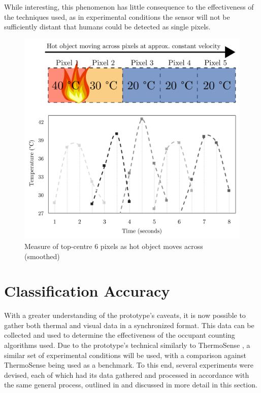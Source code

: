 \documentclass[../thesis/thesis.tex]{subfiles}
\begin{document}
While interesting, this phenomenon has little consequence to the effectiveness of the techniques used, as in experimental conditions the sensor will not be sufficiently distant that humans could be detected as single pixels.

\begin{figure}
\centering
\includegraphics[width=\textwidth]{../diagrams/03_hot_water_top_row_modified2.pdf}
\caption{Measure of top-centre 6 \mlx pixels as hot object moves across (smoothed)}
\label{fig:hotmotion}
\end{figure}


\section{Classification Accuracy}

With a greater understanding of the prototype's caveats, it is now possible to gather both thermal and visual data in a synchronized format. This data can be collected and used to determine the effectiveness of the occupant counting algorithms used. Due to the prototype's technical similarly to ThermoSense \cite{beltran2013thermosense}, a similar set of experimental conditions will be used, with a comparison against ThermoSense being used as a benchmark. To this end, several experiments were devised, each of which had its data gathered and processed in accordance with the same general process, outlined in  and discussed in more detail in this section.
\end{document}
